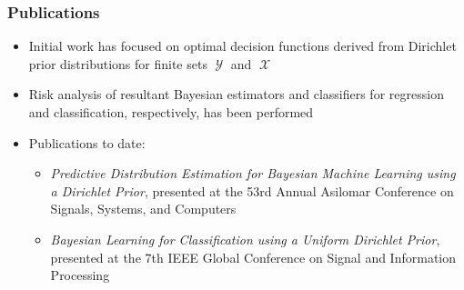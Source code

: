\documentclass[aspectratio=169,usenames,dvipsnames]{beamer}
\DeclareMathOperator{\Xcal}{\mathcal{X}}
\DeclareMathOperator{\Ycal}{\mathcal{Y}}
\begin{document}
\begin{frame} 
\frametitle{Publications}

\begin{itemize}
\item Initial work has focused on optimal decision functions derived from Dirichlet prior distributions for finite sets $\Ycal$ and $\Xcal$
\vspace{0.5em}
\item Risk analysis of resultant Bayesian estimators and classifiers for regression and classification, respectively, has been performed
\vspace{0.5em}
\item \alert{Publications to date}:
	\vspace{0.25em}
	\begin{itemize}
	\item \emph{Predictive Distribution Estimation for Bayesian Machine Learning using a Dirichlet Prior}, presented at 	the 53rd Annual Asilomar Conference on Signals, Systems, and Computers
	\vspace{0.25em}
	\item \emph{Bayesian Learning for Classification using a Uniform Dirichlet Prior}, presented at the 7th IEEE Global Conference on Signal and Information Processing
	\end{itemize}
\end{itemize}

\end{frame}
\end{document}
